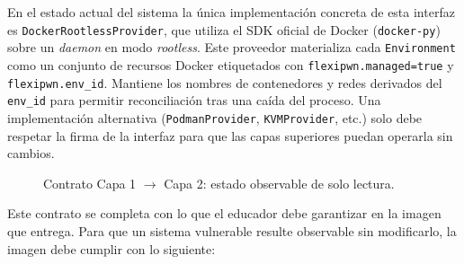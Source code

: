 En el estado actual del sistema la única implementación concreta de esta
interfaz es \texttt{DockerRootlessProvider}, que utiliza el SDK oficial de
Docker (\texttt{docker-py}) sobre un \textit{daemon} en modo \textit{rootless}.
Este proveedor materializa cada \texttt{Environment} como un conjunto de
recursos Docker etiquetados con \texttt{flexipwn.managed=true} y
\texttt{flexipwn.env\_id}. Mantiene los nombres de contenedores y redes
derivados del \texttt{env\_id} para permitir reconciliación tras una caída del
proceso. Una implementación alternativa (\texttt{PodmanProvider},
\texttt{KVMProvider}, etc.) solo debe respetar la firma de la interfaz para que
las capas superiores puedan operarla sin cambios.

\begin{figure}[h]
    \centering
    \resizebox{\textwidth}{!}{}
    \caption{Contrato Capa 1 $\rightarrow$ Capa 2: estado observable de solo
    lectura.}
    \label{fig:contrato-12}
\end{figure}

Este contrato se completa con lo que el educador debe garantizar en la imagen
que entrega. Para que un sistema vulnerable resulte observable sin
modificarlo, la imagen debe cumplir con lo siguiente:

